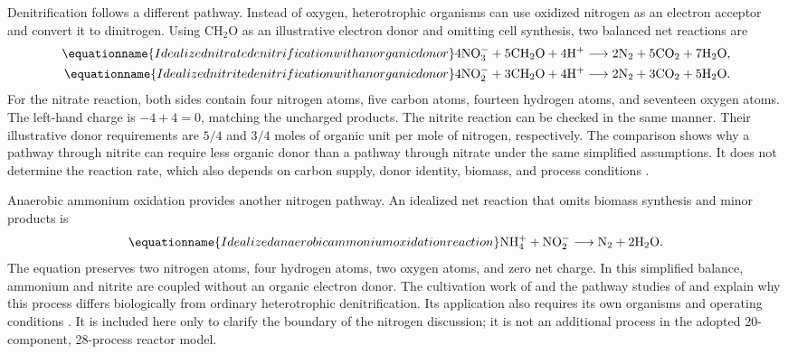 Denitrification follows a different pathway. Instead of oxygen, heterotrophic organisms can use oxidized nitrogen as an electron acceptor and convert it to dinitrogen. Using $\mathrm{CH_2O}$ as an illustrative electron donor and omitting cell synthesis, two balanced net reactions are
\begin{align}
\equationname{Idealized nitrate denitrification with an organic donor}
4\mathrm{NO_3^-}+5\mathrm{CH_2O}+4\mathrm{H^+}
&\longrightarrow2\mathrm{N_2}+5\mathrm{CO_2}+7\mathrm{H_2O},
\label{eq:teaching_nitrate_denitrification}\\
\equationname{Idealized nitrite denitrification with an organic donor}
4\mathrm{NO_2^-}+3\mathrm{CH_2O}+4\mathrm{H^+}
&\longrightarrow2\mathrm{N_2}+3\mathrm{CO_2}+5\mathrm{H_2O}.
\label{eq:teaching_nitrite_denitrification}
\end{align}
For the nitrate reaction, both sides contain four nitrogen atoms, five carbon atoms, fourteen hydrogen atoms, and seventeen oxygen atoms. The left-hand charge is $-4+4=0$, matching the uncharged products. The nitrite reaction can be checked in the same manner. Their illustrative donor requirements are $5/4$ and $3/4$ moles of organic unit per mole of nitrogen, respectively. The comparison shows why a pathway through nitrite can require less organic donor than a pathway through nitrate under the same simplified assumptions. It does not determine the reaction rate, which also depends on carbon supply, donor identity, biomass, and process conditions \citep{Lu2014}.

Anaerobic ammonium oxidation provides another nitrogen pathway. An idealized net reaction that omits biomass synthesis and minor products is
\begin{equation}
\equationname{Idealized anaerobic ammonium oxidation reaction}
\mathrm{NH_4^+}+\mathrm{NO_2^-}
\longrightarrow\mathrm{N_2}+2\mathrm{H_2O}.
\label{eq:teaching_anammox}
\end{equation}
The equation preserves two nitrogen atoms, four hydrogen atoms, two oxygen atoms, and zero net charge. In this simplified balance, ammonium and nitrite are coupled without an organic electron donor. The cultivation work of \citet{Strous1998} and the pathway studies of \citet{Dietl2015} and \citet{Maalcke2016} explain why this process differs biologically from ordinary heterotrophic denitrification. Its application also requires its own organisms and operating conditions \citep{Vandekerckhove2018,Xie2021,WinklerStraka2019}. It is included here only to clarify the boundary of the nitrogen discussion; it is not an additional process in the adopted 20-component, 28-process reactor model.

